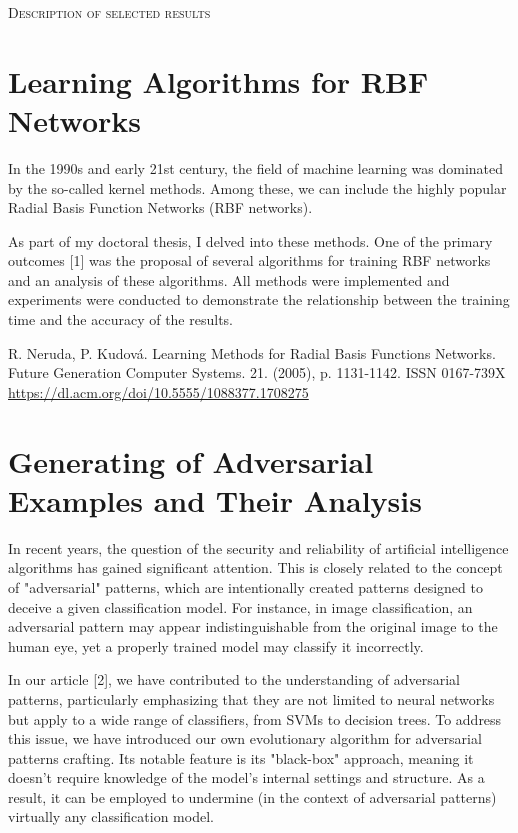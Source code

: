 \pagebreak

\noindent
{\fontsize{18}{18}\selectfont\scshape Description of selected results} 

\section{Learning Algorithms for RBF Networks}
In the 1990s and early 21st century, the field of machine learning
was dominated by the so-called kernel methods. Among these, we can
include the highly popular Radial Basis Function Networks (RBF
networks).

As part of my doctoral thesis, I delved into these methods. One of the
primary outcomes [1] was the proposal of several algorithms for
training RBF networks and an analysis of these algorithms. All methods
were implemented and experiments were conducted to demonstrate the
relationship between the training time and the accuracy of the
results.

\centerline{}
\noindent
[1] R. Neruda, P. Kudová. Learning Methods for Radial Basis Functions
Networks. Future Generation Computer Systems. 21. (2005),
p. 1131-1142. ISSN 0167-739X
\href{https://dl.acm.org/doi/10.5555/1088377.1708275}{https://dl.acm.org/doi/10.5555/1088377.1708275}


\section{Generating of Adversarial Examples and Their Analysis}

In recent years, the question of the security and reliability of
artificial intelligence algorithms has gained significant
attention. This is closely related to the concept of "adversarial"
patterns, which are intentionally created patterns designed to deceive
a given classification model. For instance, in image classification,
an adversarial pattern may appear indistinguishable from the original
image to the human eye, yet a properly trained model may classify it
incorrectly.

In our article [2], we have contributed to the understanding
of adversarial patterns, particularly emphasizing that they are not
limited to neural networks but apply to a wide range of classifiers,
from SVMs to decision trees. To address this issue, we have introduced
our own evolutionary algorithm for adversarial
patterns crafting. Its notable feature is its "black-box" approach, meaning it
doesn't require knowledge of the model's internal settings and
structure. As a result, it can be employed to undermine (in the
context of adversarial patterns) virtually any classification model.

